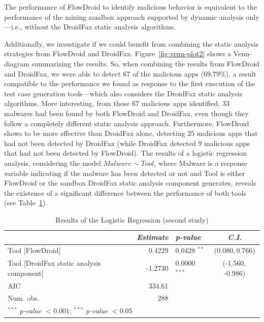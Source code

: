 \begin{finding}
  The performance of FlowDroid to identify malicious behavior
  is equivalent to the performance of the
  mining sandbox approach supported by dynamic analysis only---i.e., without
  the DroidFax static analysis algorithms.
\end{finding}

Additionally, we investigate if we could benefit from combining the
static analysis strategies from FlowDroid and DroidFax. Figure~\ref{fig:venn-plot2} shows a
Venn-diagram summarizing the results. So, when combining
the results from FlowDroid and DroidFax, we were able to detect
$67$ of the malicious apps ($69.79$\%), a result compatible
to the performance we found as response to the first execution of the
test case generation tools---which also considers the DroidFax
static analysis algorithms. More interesting, from those $67$
malicious apps identified, $33$ malwares had been found by
both FlowDroid and DroidFax, even though they follow
a completely different static analysis approach. Furthermore,
FlowDroid shows to be more effective than DroidFax alone, detecting $25$ malicious
apps that had not been detected by DroidFax (while DroidFax detected $9$
malicious apps that had not been detected by FlowDroid). {\color{red}The results
of a logistic regression analysis, considering the
model $Malware \sim Tool$, where Malware is a response
variable indicating if the malware has been detected or not and
Tool is either FlowDroid or the sandbox DroidFax
static analysis component generates, reveals the existence
of a significant difference between
the performance of both tools (see Table~\ref{tab:log-reg2}).}

\begin{table}[ht]
  \centering
     \caption{Results of the Logistic Regression (second study)} 
       \begin{small}
     \begin{tabular}{lrlc}
   \toprule
  & \emph{Estimate} & \emph{p-value} & \emph{C.I.} \\ 
   \midrule
   Tool [FlowDroid] & 0.4229 & 0.0428 $^{**}$ & (0.080$, $0.766) \\
   Tool [DroidFax static analysis component] & -1.2730 & 0.0000 $^{***}$ & (-1.560$, $-0.986) \\ \midrule
   AIC            & 334.61     \\
   Num. obs.      & 288        \\
   \bottomrule
   \multicolumn{4}{l}{\scriptsize{$^{***}$ \emph{p-value} $<0.001$; $^{***}$ \emph{p-value} $<0.05$}}
     \end{tabular}
        \end{small}

    \label{tab:log-reg2} 
\end{table}


